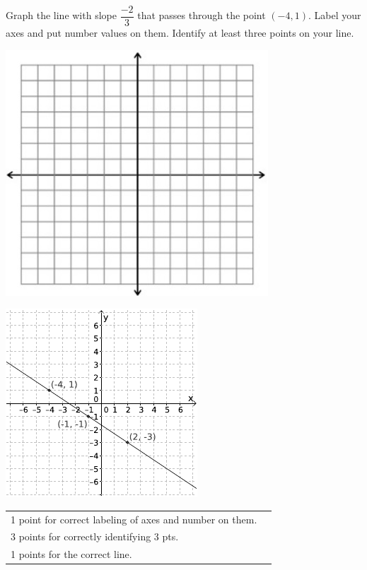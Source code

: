 {
      Graph the line with slope $\dfrac{-2}{3}$ that passes through the point $(-4, 1)$. Label your axes and put number values on them. Identify at least three points on your line.\begin{onlyproblem}\begin{center}\includegraphics{fig-graphpaper.png}\end{center}\end{onlyproblem} \begin{onlysolution}\begin{center}\includegraphics{fig095-08-a-answer}\end{center}\end{onlysolution}
}
{
	\begin{tabular}{l r}
	1 point for correct labeling of axes and number on them.\\
	3 points for correctly identifying 3 pts.\\
	1 points for the correct line.\\
	\end{tabular}
}

